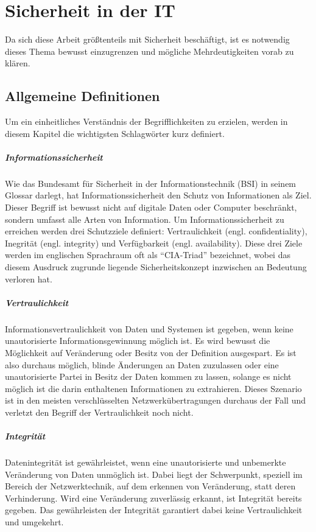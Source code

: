 \chapter{Sicherheit in der IT}
\label{chap:itsecurity}
Da sich diese Arbeit größtenteils mit Sicherheit beschäftigt, ist es notwendig dieses Thema bewusst einzugrenzen und mögliche Mehrdeutigkeiten vorab zu klären.

\section{Allgemeine Definitionen}
Um ein einheitliches Verständnis der Begrifflichkeiten zu erzielen, werden in diesem Kapitel die wichtigsten Schlagwörter kurz definiert.

\paragraph{Informationssicherheit}
Wie das Bundesamt für Sicherheit in der Informationstechnik (BSI) in seinem Glossar darlegt, hat Informationssicherheit den Schutz von Informationen als Ziel\cite{BSIGlossar}. Dieser Begriff ist bewusst nicht auf digitale Daten oder Computer beschränkt, sondern umfasst alle Arten von Information. Um Informationssicherheit zu erreichen werden drei Schutzziele definiert: Vertraulichkeit (engl. confidentiality), Inegrität (engl. integrity) und Verfügbarkeit (engl. availability). Diese drei Ziele werden im englischen Sprachraum oft als ``CIA-Triad'' bezeichnet, wobei das diesem Ausdruck zugrunde liegende Sicherheitskonzept inzwischen an Bedeutung verloren hat\cite{Cherdantseva2013}.

\paragraph{Vertraulichkeit}
Informationsvertraulichkeit von Daten und Systemen ist gegeben, wenn keine unautorisierte Informationsgewinnung möglich ist\cite[p. 10]{Eckert2013}. Es wird bewusst die Möglichkeit auf Veränderung oder Besitz von der Definition ausgespart. Es ist also durchaus möglich, blinde Änderungen an Daten zuzulassen oder eine unautorisierte Partei in Besitz der Daten kommen zu lassen, solange es nicht möglich ist die darin enthaltenen Informationen zu extrahieren. Dieses Szenario ist in den meisten verschlüsselten Netzwerkübertragungen durchaus der Fall und verletzt den Begriff der Vertraulichkeit noch nicht.    

\paragraph{Integrität}
Datenintegrität ist gewährleistet, wenn eine unautorisierte und unbemerkte Veränderung von Daten unmöglich ist\cite[p. 9]{Eckert2013}. Dabei liegt der Schwerpunkt, speziell im Bereich der Netzwerktechnik, auf dem erkennen von Veränderung, statt deren Verhinderung. Wird eine Veränderung zuverlässig erkannt, ist Integrität bereits gegeben. Das gewährleisten der Integrität garantiert dabei keine Vertraulichkeit und umgekehrt.

